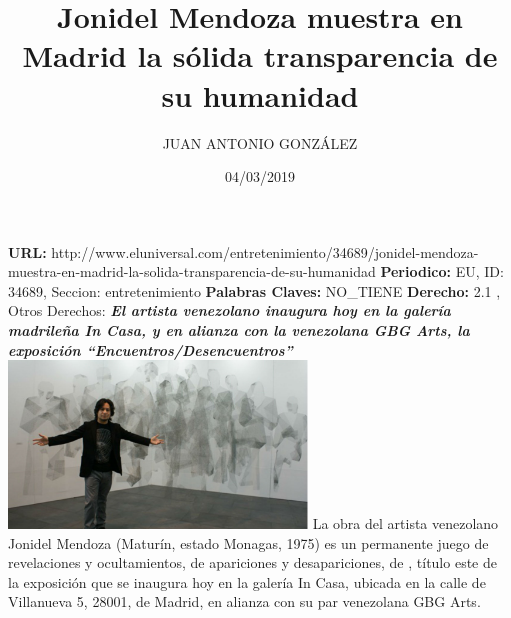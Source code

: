 \documentclass{article}%
\title{\textbf{Jonidel Mendoza muestra en Madrid la sólida transparencia de su humanidad}}%
\author{JUAN ANTONIO GONZÁLEZ}%
\date{04/03/2019}%
\begin{document}
%
\normalsize%
\maketitle%
\textbf{URL: }%
http://www.eluniversal.com/entretenimiento/34689/jonidel{-}mendoza{-}muestra{-}en{-}madrid{-}la{-}solida{-}transparencia{-}de{-}su{-}humanidad\newline%
%
\textbf{Periodico: }%
EU, %
ID: %
34689, %
Seccion: %
entretenimiento\newline%
%
\textbf{Palabras Claves: }%
NO\_TIENE\newline%
%
\textbf{Derecho: }%
2.1%
, Otros Derechos: %
\newline%
%
\textbf{\textit{El artista venezolano inaugura hoy en la galería madrileña In Casa, y en alianza con la venezolana GBG Arts, la exposición “Encuentros/Desencuentros”}}%
\newline%
\newline%
%
\includegraphics[width=300px]{EU_34689.jpg}%
\newline%
%
La obra del artista venezolano Jonidel Mendoza (Maturín, estado Monagas, 1975) es un permanente juego de revelaciones y ocultamientos, de apariciones y desapariciones, de%
\newline%
%
, título este de la exposición que se inaugura hoy en la galería In Casa, ubicada en la calle de Villanueva 5, 28001, de Madrid, en alianza con su par venezolana GBG Arts.%
\newline%
%
\end{document}
